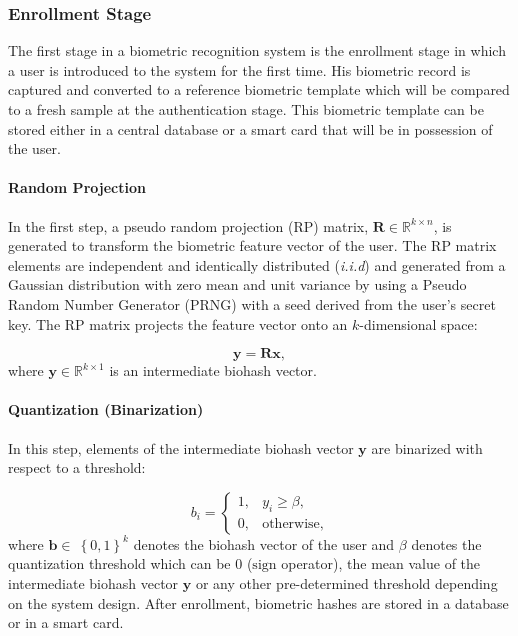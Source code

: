 \documentclass[conference]{IEEEtran}
\begin{document}
\subsubsection{Enrollment Stage}

The first stage in a biometric recognition system is the enrollment
stage in which a user is introduced to the system for the first
time. His biometric record is captured and converted to a
reference biometric template which will be compared to a fresh
sample at the authentication stage. This biometric template can be
stored either in a central database or a smart card that will be in
possession of the user.

\paragraph{Random Projection}

In the first step, a pseudo random projection (RP) matrix,
$\mathbf{R}\in\mathbb{R}^{k\times n}$, is generated to transform
the biometric feature vector of the user. The RP matrix elements are independent
and identically distributed (\textit{i.i.d}) and generated from a
Gaussian distribution with zero mean and unit variance by using a
Pseudo Random Number Generator (PRNG) with a seed derived from the
user's secret key. The RP matrix projects the feature vector onto
an $k$-dimensional space:

\begin{equation}
 \mathbf{y}=\mathbf{R}
 \mathbf{x},
\end{equation}
where $\mathbf{y}\in\mathbb{R}^{k\times1}$ is an intermediate
biohash vector.

\paragraph{Quantization (Binarization)}

In this step, elements of the intermediate biohash vector
$\mathbf{y}$ are binarized with respect to a threshold:

\begin{equation}
b_i = \begin{cases}
1, & y_i \geq \beta, \\
0, & \text{otherwise},
\end{cases}
\end{equation}
where $\mathbf{b}\in\ \left\{0,1\right\}^{k}$ denotes the biohash
vector of the user and $\beta$ denotes the quantization threshold
which can be 0 ($\text{sign}$ operator), the mean value of the
intermediate biohash vector $\mathbf{y}$ or any other pre-determined threshold depending on the system
design. After enrollment, biometric hashes are stored in a database or in a smart card.
\end{document}
